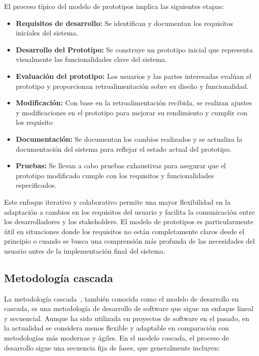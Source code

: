 El proceso típico del modelo de prototipos implica las siguientes etapas:
\begin{itemize}
	\item \textbf{Requisitos de desarrollo:}
Se identifican y documentan los requisitos iniciales del sistema.

\item \textbf{Desarrollo del Prototipo:}
Se construye un prototipo inicial que representa visualmente las funcionalidades clave del sistema.

\item \textbf{Evaluación del prototipo:}
Los usuarios y las partes interesadas evalúan el prototipo y proporcionan retroalimentación sobre su diseño y funcionalidad.

\item \textbf{Modificación:}
Con base en la retroalimentación recibida, se realizan ajustes y modificaciones en el prototipo para mejorar su rendimiento y cumplir con los requisito

\item \textbf{Documentación:}
Se documentan los cambios realizados y se actualiza la documentación del sistema para reflejar el estado actual del prototipo.

\item \textbf{Pruebas:}
Se llevan a cabo pruebas exhaustivas para asegurar que el prototipo modificado cumple con los requisitos y funcionalidades especificados.
\end{itemize}

Este enfoque iterativo y colaborativo permite una mayor flexibilidad en la adaptación a cambios en los requisitos del usuario y facilita la comunicación entre los desarrolladores y los stakeholders. El modelo de prototipos es particularmente útil en situaciones donde los requisitos no están completamente claros desde el principio o cuando se busca una comprensión más profunda de las necesidades del usuario antes de la implementación final del sistema.

\subsection{Metodología cascada}
La metodología cascada~\cite{misc:Metodologia_Cascada}, también conocida como el modelo de desarrollo en cascada, es una metodología de desarrollo de software que sigue un enfoque lineal y secuencial. Aunque ha sido utilizada en proyectos de software en el pasado, en la actualidad se considera menos flexible y adaptable en comparación con metodologías más modernas y ágiles.
En el modelo cascada, el proceso de desarrollo sigue una secuencia fija de fases, que generalmente incluyen:

